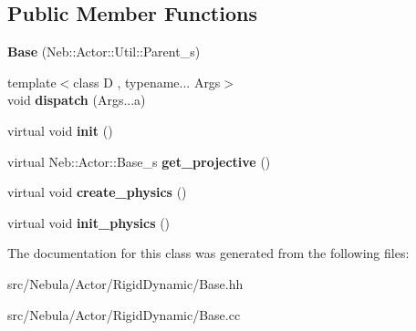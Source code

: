 \subsection*{\-Public \-Member \-Functions}
\begin{DoxyCompactItemize}
\item 
\hypertarget{classNeb_1_1Actor_1_1RigidDynamic_1_1Base_a98c6df43d4c8459622d83454843a68de}{{\bfseries \-Base} (\-Neb\-::\-Actor\-::\-Util\-::\-Parent\-\_\-s)}\label{classNeb_1_1Actor_1_1RigidDynamic_1_1Base_a98c6df43d4c8459622d83454843a68de}

\item 
\hypertarget{classNeb_1_1Actor_1_1RigidDynamic_1_1Base_a86cc12cbd237ad308058c4dd11149c6a}{{\footnotesize template$<$class D , typename... \-Args$>$ }\\void {\bfseries dispatch} (\-Args...\-a)}\label{classNeb_1_1Actor_1_1RigidDynamic_1_1Base_a86cc12cbd237ad308058c4dd11149c6a}

\item 
\hypertarget{classNeb_1_1Actor_1_1RigidDynamic_1_1Base_abfa848641728a269caa8f33f90e0aefe}{virtual void {\bfseries init} ()}\label{classNeb_1_1Actor_1_1RigidDynamic_1_1Base_abfa848641728a269caa8f33f90e0aefe}

\item 
\hypertarget{classNeb_1_1Actor_1_1RigidDynamic_1_1Base_ad1c9481bfe62c3d4f5e165701726f5f0}{virtual \-Neb\-::\-Actor\-::\-Base\-\_\-s {\bfseries get\-\_\-projective} ()}\label{classNeb_1_1Actor_1_1RigidDynamic_1_1Base_ad1c9481bfe62c3d4f5e165701726f5f0}

\item 
\hypertarget{classNeb_1_1Actor_1_1RigidDynamic_1_1Base_a6d31eca34832fa53bee2d87d5734687e}{virtual void {\bfseries create\-\_\-physics} ()}\label{classNeb_1_1Actor_1_1RigidDynamic_1_1Base_a6d31eca34832fa53bee2d87d5734687e}

\item 
\hypertarget{classNeb_1_1Actor_1_1RigidDynamic_1_1Base_af78e5005f5bbf21ad31774bc968f79ac}{virtual void {\bfseries init\-\_\-physics} ()}\label{classNeb_1_1Actor_1_1RigidDynamic_1_1Base_af78e5005f5bbf21ad31774bc968f79ac}

\end{DoxyCompactItemize}


\-The documentation for this class was generated from the following files\-:\begin{DoxyCompactItemize}
\item 
src/\-Nebula/\-Actor/\-Rigid\-Dynamic/\-Base.\-hh\item 
src/\-Nebula/\-Actor/\-Rigid\-Dynamic/\-Base.\-cc\end{DoxyCompactItemize}
